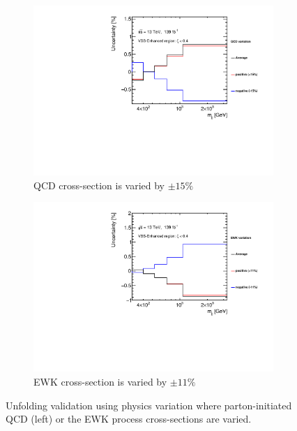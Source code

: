 \begin{figure}[htb]
    \centering
    \begin{subfigure}{.48\textwidth}
        \centering
        \includegraphics[width=.9\linewidth]{figures/Analysis/Unfolding/QCD_xsec_variation.pdf}
        \caption{ QCD cross-section is varied by $\pm  15\%$ \label{fig:unfolding_xsec_var_QCD} }
    \end{subfigure}
    \begin{subfigure}{.48\textwidth}
        \centering
        \includegraphics[width=.9\linewidth]{figures/Analysis/Unfolding/EWK_xsec_variation.pdf}
        \caption{ EWK cross-section is varied by $\pm 11\%$ \label{fig:unfolding_xsec_var_EWK}}
    \end{subfigure}
    \caption{ Unfolding validation using physics variation where parton-initiated QCD (left) or the EWK process cross-sections are varied. \label{fig:unfolding_xsec_var}}
\end{figure}

